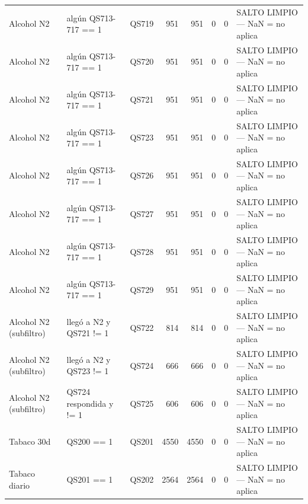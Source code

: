 \begin{table}[htbp]
\begin{tabular}{lllrrrrl}
Alcohol N2 & algún QS713-717 == 1 & QS719 & 951 & 951 & 0 & 0 & SALTO LIMPIO — NaN = no aplica \\
Alcohol N2 & algún QS713-717 == 1 & QS720 & 951 & 951 & 0 & 0 & SALTO LIMPIO — NaN = no aplica \\
Alcohol N2 & algún QS713-717 == 1 & QS721 & 951 & 951 & 0 & 0 & SALTO LIMPIO — NaN = no aplica \\
Alcohol N2 & algún QS713-717 == 1 & QS723 & 951 & 951 & 0 & 0 & SALTO LIMPIO — NaN = no aplica \\
Alcohol N2 & algún QS713-717 == 1 & QS726 & 951 & 951 & 0 & 0 & SALTO LIMPIO — NaN = no aplica \\
Alcohol N2 & algún QS713-717 == 1 & QS727 & 951 & 951 & 0 & 0 & SALTO LIMPIO — NaN = no aplica \\
Alcohol N2 & algún QS713-717 == 1 & QS728 & 951 & 951 & 0 & 0 & SALTO LIMPIO — NaN = no aplica \\
Alcohol N2 & algún QS713-717 == 1 & QS729 & 951 & 951 & 0 & 0 & SALTO LIMPIO — NaN = no aplica \\
Alcohol N2 (subfiltro) & llegó a N2 y QS721 != 1 & QS722 & 814 & 814 & 0 & 0 & SALTO LIMPIO — NaN = no aplica \\
Alcohol N2 (subfiltro) & llegó a N2 y QS723 != 1 & QS724 & 666 & 666 & 0 & 0 & SALTO LIMPIO — NaN = no aplica \\
Alcohol N2 (subfiltro) & QS724 respondida y != 1 & QS725 & 606 & 606 & 0 & 0 & SALTO LIMPIO — NaN = no aplica \\
Tabaco 30d & QS200 == 1 & QS201 & 4550 & 4550 & 0 & 0 & SALTO LIMPIO — NaN = no aplica \\
Tabaco diario & QS201 == 1 & QS202 & 2564 & 2564 & 0 & 0 & SALTO LIMPIO — NaN = no aplica \\
\bottomrule
\end{tabular}
\end{table}
